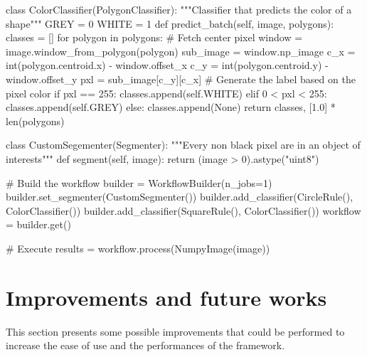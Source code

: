 \begin{python}[language=python,label={lst:toy_classify},caption={Toy example - Classifier}] 
class ColorClassifier(PolygonClassifier):
    """Classifier that predicts the color of a shape"""
    GREY = 0
    WHITE = 1
    def predict_batch(self, image, polygons):
        classes = []
        for polygon in polygons:
            # Fetch center pixel
            window = image.window_from_polygon(polygon)
            sub_image = window.np_image
            c_x = int(polygon.centroid.x) - window.offset_x
            c_y = int(polygon.centroid.y) - window.offset_y
            pxl = sub_image[c_y][c_x]
            # Generate the label based on the pixel color
            if pxl == 255:
                classes.append(self.WHITE)
            elif 0 < pxl < 255:
                classes.append(self.GREY)
            else:
                classes.append(None)
        return classes, [1.0] * len(polygons)

\end{python}

\begin{python}[language=python,label={lst:toy_segment},caption={Toy example - Segmentation implementation}] 
class CustomSegementer(Segmenter):
    """Every non black pixel are in an object of interests"""
    def segment(self, image):
        return (image > 0).astype("uint8")
\end{python}

\begin{python}[language=python,label={lst:toy_build_and_call},caption={Toy example - Applying the framework}] 
# Build the workflow
builder = WorkflowBuilder(n_jobs=1)
builder.set_segmenter(CustomSegmenter())
builder.add_classifier(CircleRule(), ColorClassifier())
builder.add_classifier(SquareRule(), ColorClassifier())
workflow = builder.get()

# Execute
results = workflow.process(NumpyImage(image))
\end{python}

\section{Improvements and future works}
\label{sec:work_future_works}
This section presents some possible improvements that could be performed to increase the ease of use and the performances of the framework. 

